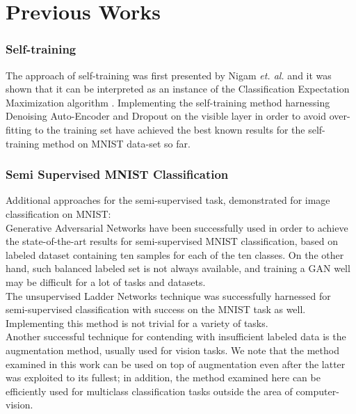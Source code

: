 \documentclass[conference, letterpaper]{IEEEtran}
\begin{document}
\section{Previous Works}

\subsubsection{Self-training}
The approach of self-training was first presented by Nigam \textit{et. al.} \cite{nigam2000analyzing} and it was shown that it can be interpreted as an instance of the Classification Expectation Maximization algorithm \cite{Amini:2002:SLR:3000905.3000988}.
Implementing the self-training method harnessing Denoising Auto-Encoder and Dropout \cite{hinton2012improving} on the visible layer in order to avoid over-fitting to the training set \cite{lee2013pseudo} have achieved the best known results for the self-training method on MNIST data-set so far.
\subsubsection{Semi Supervised MNIST Classification}
 Additional approaches for the semi-supervised task, demonstrated for image classification on MNIST:\\
 Generative Adversarial Networks \cite{salimans2016improved} have been successfully used in order to achieve the state-of-the-art results for semi-supervised MNIST classification, based on labeled dataset containing ten samples for each of the ten classes. On the other hand, such balanced labeled set is not always available, and training a GAN well may be difficult for a lot of tasks and datasets. \\ The unsupervised Ladder Networks technique \cite{valpola2015neural} was successfully harnessed for semi-supervised classification \cite{NIPS2015_5947} with success on the MNIST task as well. Implementing this method is not trivial for a variety of tasks.\\
 Another successful technique for contending with insufficient labeled data is the augmentation method, usually used for vision tasks.  We note that the method examined in this work can be used on top of augmentation even after the latter was exploited to its fullest; in addition, the method examined here can be efficiently used for multiclass classification tasks outside the area of computer-vision.  
 
\end{document}
